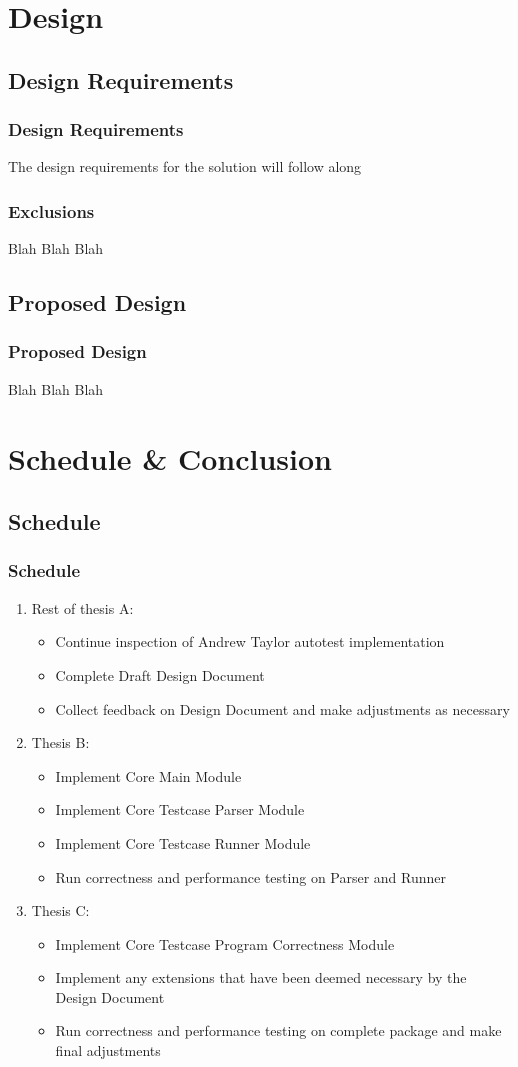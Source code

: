 \documentclass[xcolor]{beamer}
\begin{document}
\section{Design}
\subsection{Design Requirements}
\begin{frame}
	\frametitle{Design Requirements}
	The design requirements for the solution will follow along
\end{frame}
\begin{frame}
	\frametitle{Exclusions}
	Blah Blah Blah
\end{frame}
\subsection{Proposed Design}
\begin{frame}
	\frametitle{Proposed Design}
	Blah Blah Blah
\end{frame}

\section{Schedule \& Conclusion}
\subsection{Schedule}
\begin{frame}
	\frametitle{Schedule}
	\begin{enumerate}
		\item Rest of thesis A:
		\begin{itemize}
			\item Continue inspection of Andrew Taylor autotest implementation
				\pause
			\item Complete Draft Design Document
				\pause
			\item Collect feedback on Design Document and make adjustments as necessary
				\pause 
		\end{itemize}
		\item Thesis B:
		\begin{itemize}
			\item Implement Core Main Module
				\pause
			\item Implement Core Testcase Parser Module
				\pause
			\item Implement Core Testcase Runner Module
				\pause
			\item Run correctness and performance testing on Parser and Runner
				\pause
		\end{itemize}
		\item Thesis C:
		\begin{itemize}
			\item Implement Core Testcase Program Correctness Module
				\pause
			\item Implement any extensions that have been deemed necessary by the Design Document
				\pause
			\item Run correctness and performance testing on complete package and make final adjustments
		\end{itemize}
	\end{enumerate}
\end{frame}
\end{document}
